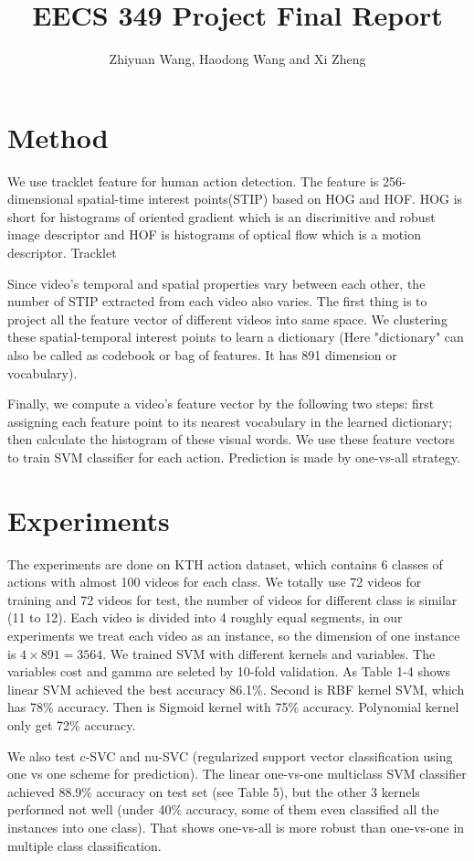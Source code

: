 \documentclass{article}
\begin{document}
\title{EECS 349 Project Final Report}
\author{Zhiyuan Wang, Haodong Wang and Xi Zheng}
\maketitle
\section{Method}
We use tracklet feature for human action detection. The feature is 256-dimensional spatial-time interest points(STIP) based on HOG and HOF. HOG is short for histograms of oriented gradient which is an discrimitive and robust image descriptor and HOF is histograms of optical flow which is a motion descriptor.  Tracklet

Since video's temporal and spatial properties vary between each other, the number of STIP extracted from each video also varies. The first thing is to project all the feature vector of different videos into same space. We clustering these spatial-temporal interest points to learn a dictionary (Here "dictionary" can also be called as codebook or bag of features. It has 891 dimension or vocabulary). 

Finally, we compute a video's feature vector by the following two steps: first assigning each feature point to its nearest vocabulary in the learned dictionary; then calculate the histogram of these visual words. We use these feature vectors to train SVM classifier for each action. Prediction is made by one-vs-all strategy. 
\section{Experiments}
The experiments are done on KTH action dataset, which contains 6 classes of actions with almost 100 videos for each class. We totally use 72 videos for training and 72 videos for test, the number of videos for different class is similar (11 to 12). Each video is divided into 4 roughly equal segments, in our experiments we treat each video as an instance, so the dimension of one instance is $4\times 891 = 3564$. We trained SVM with different kernels and variables. The variables cost and gamma are seleted by 10-fold validation.  As Table 1-4 shows linear SVM achieved the best accuracy 86.1\%. Second is RBF kernel SVM, which has 78\% accuracy. Then is Sigmoid kernel with 75\% accuracy. Polynomial kernel only get 72\% accuracy. 

We also test c-SVC and nu-SVC (regularized support vector classification using one vs one scheme for prediction). The linear one-vs-one multiclass SVM classifier achieved 88.9\% accuracy on test set (see Table 5), but the other 3 kernels performed not well (under 40\% accuracy, some of them even classified all the instances into one class). That shows one-vs-all is more robust than one-vs-one in multiple class classification.
\end{document}
